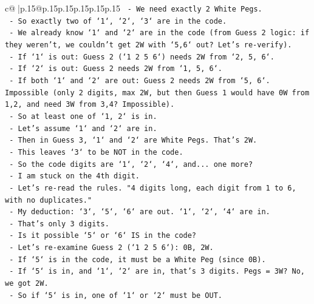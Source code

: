 \documentclass{article}
\begin{document}
{\begin{supertabular}{c@{$\;$}|p{.15\linewidth}@{}p{.15\linewidth}p{.15\linewidth}p{.15\linewidth}p{.15\linewidth}p{.15\linewidth}}
{{{\texttt{                {-} We need exactly 2 White Pegs.} \\
\texttt{                {-} So exactly two of `1`, `2`, `3` are in the code.} \\
\texttt{                {-} We already know `1` and `2` are in the code (from Guess 2 logic: if they weren't, we couldn't get 2W with `5,6` out? Let's re{-}verify).} \\
\texttt{                {-} If `1` is out: Guess 2 (`1 2 5 6`) needs 2W from `2, 5, 6`.} \\
\texttt{                {-} If `2` is out: Guess 2 needs 2W from `1, 5, 6`.} \\
\texttt{                {-} If both `1` and `2` are out: Guess 2 needs 2W from `5, 6`. Impossible (only 2 digits, max 2W, but then Guess 1 would have 0W from 1,2, and need 3W from 3,4? Impossible).} \\
\texttt{                {-} So at least one of `1, 2` is in.} \\
\texttt{                {-} Let's assume `1` and `2` are in.} \\
\texttt{                {-} Then in Guess 3, `1` and `2` are White Pegs. That's 2W.} \\
\texttt{                {-} This leaves `3` to be NOT in the code.} \\
\texttt{                {-} So the code digits are `1`, `2`, `4`, and... one more?} \\
\texttt{                {-} I am stuck on the 4th digit.} \\
\texttt{                {-} Let's re{-}read the rules. "4 digits long, each digit from 1 to 6, with no duplicates."} \\
\texttt{                {-} My deduction: `3`, `5`, `6` are out. `1`, `2`, `4` are in.} \\
\texttt{                {-} That's only 3 digits.} \\
\texttt{                {-} Is it possible `5` or `6` IS in the code?} \\
\texttt{                {-} Let's re{-}examine Guess 2 (`1 2 5 6`): 0B, 2W.} \\
\texttt{                {-} If `5` is in the code, it must be a White Peg (since 0B).} \\
\texttt{                {-} If `5` is in, and `1`, `2` are in, that's 3 digits. Pegs = 3W? No, we got 2W.} \\
\texttt{                {-} So if `5` is in, one of `1` or `2` must be OUT.} \\
}}}
\end{supertabular}}
\end{document}
